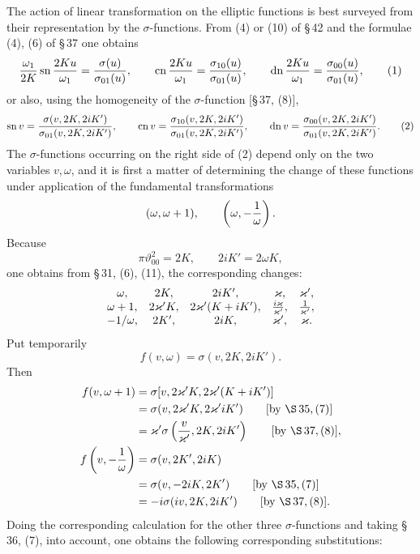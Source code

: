 \documentclass[11pt]{article}
\providecommand{\tht}{\vartheta}
\providecommand{\sn}{\operatorname{sn}}
\providecommand{\cn}{\operatorname{cn}}
\providecommand{\dn}{\operatorname{dn}}
\begin{document}
The action of linear transformation on the elliptic functions is best surveyed from their representation by the $\sigma$-functions. From (4) or (10) of \S\,42 and the formulae (4), (6) of \S\,37 one obtains
\begin{equation}
{\omega_1\over2K}\sn{2Ku\over\omega_1}={\sigma(u)\over\sigma_{01}(u)},
\qquad
\cn{2Ku\over\omega_1}={\sigma_{10}(u)\over\sigma_{01}(u)},
\qquad
\dn{2Ku\over\omega_1}={\sigma_{00}(u)\over\sigma_{01}(u)},
\tag{1}
\end{equation}
or also, using the homogeneity of the $\sigma$-function [\S\,37, (8)],
\begin{equation}
\sn v={\sigma(v,2K,2iK')\over\sigma_{01}(v,2K,2iK')},
\qquad
\cn v={\sigma_{10}(v,2K,2iK')\over\sigma_{01}(v,2K,2iK')},
\qquad
\dn v={\sigma_{00}(v,2K,2iK')\over\sigma_{01}(v,2K,2iK')}.
\tag{2}
\end{equation}
The $\sigma$-functions occurring on the right side of (2) depend only on the two variables $v,\omega$, and it is first a matter of determining the change of these functions under application of the fundamental transformations
\[
(\omega,\omega+1),
\qquad
\left(\omega,-{1\over\omega}\right).
\]
Because
\[
\pi\tht_{00}^{2}=2K,
\qquad
2iK'=2\omega K,
\]
one obtains from \S\,31, (6), (11), the corresponding changes:
\[
\begin{array}{ccccc}
\omega,&2K,&2iK',&\varkappa,&\varkappa',\\
\omega+1,&2\varkappa'K,&2\varkappa'(K+iK'),&{i\varkappa\over\varkappa'},&{1\over\varkappa'},\\
-1/\omega,&2K',&2iK,&\varkappa',&\varkappa.
\end{array}
\]
Put temporarily
\[
f(v,\omega)=\sigma(v,2K,2iK').
\]
Then
\begin{align*}
f(v,\omega+1)&=\sigma[v,2\varkappa'K,2\varkappa'(K+iK')]\\
&=\sigma(v,2\varkappa'K,2\varkappa'iK') \qquad [\text{by }\S\,35,(7)]\\
&=\varkappa'\sigma\left({v\over\varkappa'},2K,2iK'\right) \qquad [\text{by }\S\,37,(8)],\\
f\left(v,-{1\over\omega}\right)&=\sigma(v,2K',2iK)\\
&=\sigma(v,-2iK,2K') \qquad [\text{by }\S\,35,(7)]\\
&=-i\sigma(iv,2K,2iK') \qquad [\text{by }\S\,37,(8)].
\end{align*}
Doing the corresponding calculation for the other three $\sigma$-functions and taking \S\,36, (7), into account, one obtains the following corresponding substitutions:
\end{document}
